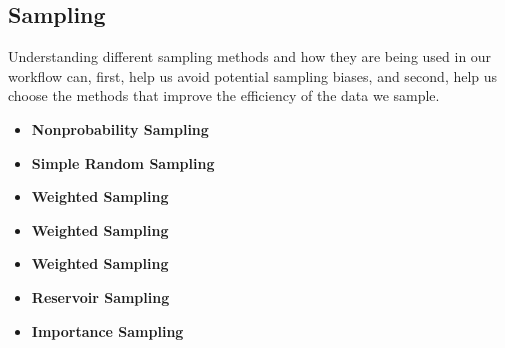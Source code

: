 \subsection*{Sampling}
Understanding different sampling methods and how they are being
used in our workflow can, first, help us avoid potential sampling
biases, and second, help us choose the methods that improve the
efficiency of the data we sample.



\begin{itemize}
    \item \textbf{Nonprobability Sampling}
    
    \noindent




    \item \textbf{Simple Random Sampling}
    
    \noindent




    \item \textbf{Weighted Sampling}
    
    \noindent





    \item \textbf{Weighted Sampling}
    
    \noindent




    \item \textbf{Weighted Sampling}
    
    \noindent



    \item \textbf{Reservoir Sampling}
    
    \noindent



    \item \textbf{Importance Sampling}
    
    \noindent




\end{itemize}


















